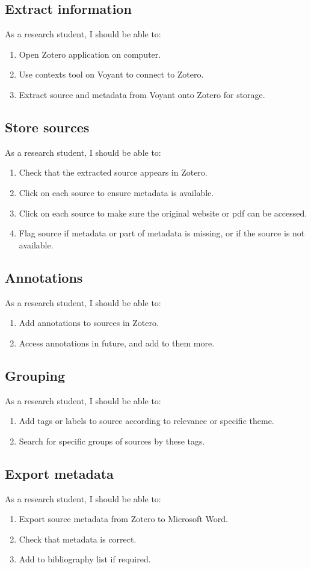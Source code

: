 \documentclass{article}
\begin{document}
\subsection{Extract information}
As a research student, I should be able to:
\begin{enumerate}
    \item Open Zotero application on computer.
    \item Use contexts tool on Voyant to connect to Zotero.
    \item Extract source and metadata from Voyant onto Zotero for storage.
   \end{enumerate}
\subsection{Store sources}
As a research student, I should be able to:
\begin{enumerate}
    \item Check that the extracted source appears in Zotero.
    \item Click on each source to ensure metadata is available.
    \item Click on each source to make sure the original website or pdf can be accessed.
    \item Flag source if metadata or part of metadata is missing, or if the source is not available.
\end{enumerate}
\subsection{Annotations}
As a research student, I should be able to:
\begin{enumerate}
    \item Add annotations to sources in Zotero.
    \item Access annotations in future, and add to them more.
    \end{enumerate}
\subsection{Grouping}
As a research student, I should be able to:
\begin{enumerate}
    \item Add tags or labels to source according to relevance or specific theme.
    \item Search for specific groups of sources by these tags.
\end{enumerate}
\subsection{Export metadata}
As a research student, I should be able to:
\begin{enumerate}
    \item Export source metadata from Zotero to Microsoft Word.
    \item Check that metadata is correct.
    \item Add to bibliography list if required.
\end{enumerate}
\end{document}
